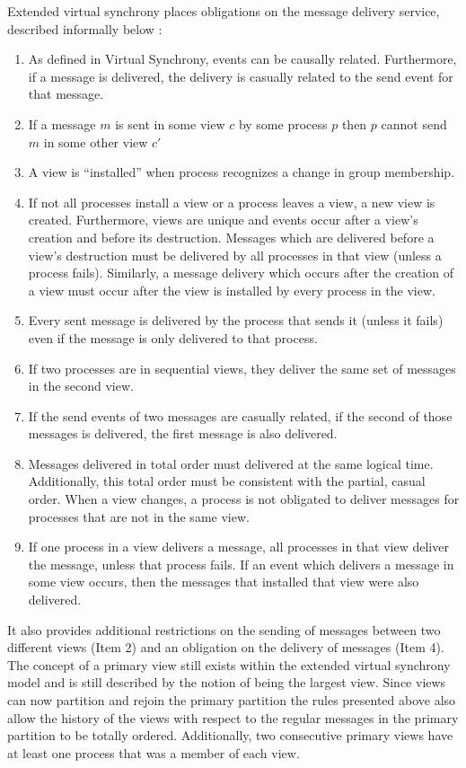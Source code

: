 Extended virtual synchrony places obligations on the message delivery service, described informally below \cite{EXTENDEDVIRTUALSYNCHRONY}:
\begin{enumerate}
	\item As defined in Virtual Synchrony, events can be causally related.
		Furthermore, if a message is delivered, the delivery is casually
		related to the send event for that message. 
	\item If a message $m$ is sent in some view $c$ by some process $p$ then $p$
		cannot send $m$ in some other view $c'$
	\item A view is ``installed'' when process recognizes a change in group membership.
	\item If not all processes install a view or a process leaves a view, a new
		view is created. Furthermore, views are unique and events occur after a
		view's creation and before its destruction. Messages which are delivered
		before a view's destruction must be delivered by all processes in that
		view (unless a process fails). Similarly, a message delivery which occurs
		after the creation of a view must occur after the view is installed by
		every process in the view.
	\item Every sent message is delivered by the process that sends it (unless it
		fails) even if the message is only delivered to that process.
	\item If two processes are in sequential views, they deliver the same set of
		messages in the second view.
	\item If the send events of two messages are casually related, if the
		second of those messages is delivered, the first message is also delivered.
	\item Messages delivered in total order must delivered at the same logical time.
		Additionally, this total order must be consistent with the partial, casual
		order. When a view changes, a process is not obligated to deliver messages
		for processes that are not in the same view.
	\item If one process in a view delivers a message, all processes in that view
		deliver the message, unless that process fails. If an event which delivers
		a message in some view occurs, then the messages that installed that view
		were also delivered.
\end{enumerate}

It also provides additional restrictions on the sending of messages between two different views (Item 2) and an obligation on the delivery of messages (Item 4). The concept of a primary view still exists within the extended virtual synchrony model and is still described by the notion of being the largest view. Since views can now partition and rejoin the primary partition the rules presented above also allow the history of the views with respect to the regular messages in the primary partition to be totally ordered. Additionally, two consecutive primary views have at least one process that was a member of each view.

